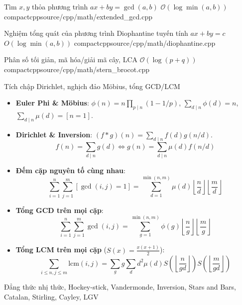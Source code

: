 {Tìm $x,y$ thỏa phương trình $ax + by = \gcd(a, b)$}
{$\mathcal{O}(\log \min(a,b))$}
{compactcpp}{source/cpp/math/extended_gcd.cpp}

{Nghiệm tổng quát của phương trình Diophantine tuyến tính $ax + by = c$}
{$O(\log \min(a, b))$}
{compactcpp}{source/cpp/math/diophantine.cpp}

{Phân số tối giản, mã hóa/giải mã cây, LCA}
{$\mathcal{O}(\log(p + q))$}
{compactcpp}{source/cpp/math/stern_brocot.cpp}

{Tích chập Dirichlet, nghịch đảo M\"obius, tổng GCD/LCM}
{}
{}{}

\begin{itemize}
    \item \textbf{Euler Phi \& M\"obius}: $\phi(n) = n \prod_{p \mid n} (1 - 1/p)$, $\sum_{d \mid n} \phi(d) = n$, $\sum_{d \mid n} \mu(d) = [n = 1]$.
    \item \textbf{Dirichlet \& Inversion}: $(f * g)(n) = \sum_{d \mid n} f(d) g(n / d)$.
    $$ f(n) = \sum_{d \mid n} g(d) \iff g(n) = \sum_{d \mid n} \mu(d) f(n / d) $$
    \item \textbf{Đếm cặp nguyên tố cùng nhau}:
    $$ \sum_{i=1}^n \sum_{j=1}^m [\gcd(i, j) = 1] = \sum_{d=1}^{\min(n, m)} \mu(d) \left\lfloor \frac{n}{d} \right\rfloor \left\lfloor \frac{m}{d} \right\rfloor $$
    \item \textbf{Tổng GCD trên mọi cặp}:
    $$ \sum_{i=1}^n \sum_{j=1}^m \gcd(i, j) = \sum_{g=1}^{\min(n, m)} \phi(g) \left\lfloor \frac{n}{g} \right\rfloor \left\lfloor \frac{m}{g} \right\rfloor $$
    \item \textbf{Tổng LCM trên mọi cặp} ($S(x) = \frac{x(x+1)}{2}$):
    $$ \sum_{i \le n, j \le m} \text{lcm}(i, j) = \sum_{g} g \sum_{d} d^2 \mu(d) S\left(\left\lfloor \frac{n}{gd} \right\rfloor\right) S\left(\left\lfloor \frac{m}{gd} \right\rfloor\right) $$
\end{itemize}

{Đẳng thức nhị thức, Hockey-stick, Vandermonde, Inversion, Stars and Bars, Catalan, Stirling, Cayley, LGV}
{}
{}{}

